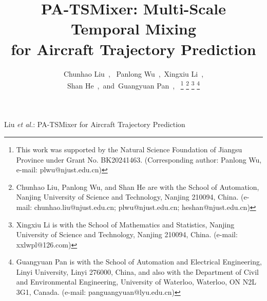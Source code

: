 \documentclass[letterpaper,journal]{IEEEtran}
\begin{document}
\title{PA-TSMixer: Multi-Scale Temporal Mixing \\ for Aircraft Trajectory Prediction}

\author{Chunhao Liu~,~
        Panlong Wu~,~Xingxiu Li~,\\
        Shan He~,~and~Guangyuan Pan~,~
\thanks{This work was supported by the Natural Science Foundation of Jiangsu Province under Grant No. BK20241463. (Corresponding author: Panlong Wu, e-mail: plwu@njust.edu.cn)}
\thanks{Chunhao Liu, Panlong Wu, and Shan He are with the School of Automation,
Nanjing University of Science and Technology, Nanjing 210094, China.
(e-mail: chunhao.liu@njust.edu.cn; plwu@njust.edu.cn; heshan@njust.edu.cn)}
\thanks{Xingxiu Li is with the School of Mathematics and Statistics,
Nanjing University of Science and Technology, Nanjing 210094, China.
(e-mail: xxlwpl@126.com)}
\thanks{Guangyuan Pan is with the School of Automation and Electrical Engineering,
Linyi University, Linyi 276000, China, and also with the Department of Civil and
Environmental Engineering, University of Waterloo, Waterloo, ON N2L 3G1, Canada.
(e-mail: panguangyuan@lyu.edu.cn)}}

%
{Liu \MakeLowercase{\textit{et al.}}: PA-TSMixer for Aircraft Trajectory Prediction}

\maketitle
\end{document}
